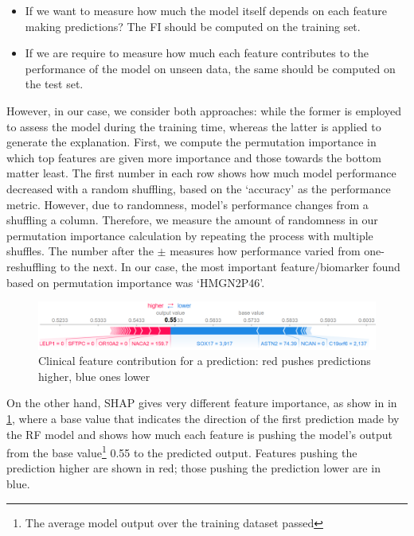 \begin{itemize} [noitemsep]
    \item If we want to measure how much the model itself depends on each feature making predictions? The FI should be computed on the training set.
    \item If we are require to measure how much each feature contributes to the performance of the model on unseen data, the same should be computed on the test set. 
\end{itemize}

\hspace*{3.5mm} However, in our case, we consider both approaches: while the former is employed to assess the model during the training time, whereas the latter is applied to generate the explanation. First, we compute the permutation importance in which top features are given more importance and those towards the bottom matter least.
The first number in each row shows how much model performance decreased with a random shuffling, based on the `accuracy' as the performance metric. 
However, due to randomness, model's performance changes from a shuffling a column. Therefore, we measure the amount of randomness in our permutation importance calculation by repeating the process with multiple shuffles. The number after the $±$ measures how performance varied from one-reshuffling to the next. In our case, the most important feature/biomarker found based on permutation importance was `HMGN2P46'. %

\begin{figure}[h]
\centering
	\includegraphics[scale=0.8]{images/shap.png}
	\caption{Clinical feature contribution for a prediction: red pushes predictions higher, blue ones lower} 
	\label{fig:shap}
	\vspace{-2mm}
\end{figure}

\hspace*{3.5mm} On the other hand, SHAP gives very different feature importance, as show in in \cref{fig:shap}, where a base value that indicates the direction of the first prediction made by the RF model and shows how much each feature is pushing the model's output from the base value\footnote{The average model output over the training dataset passed} 0.55 to the predicted output. Features pushing the prediction higher are shown in red; those pushing the prediction lower are in blue.

